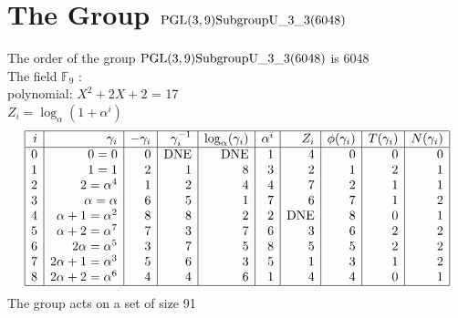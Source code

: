 
\section{The Group ${\rm PGL}(3,9){\rm Subgroup U\_3\_3}(6048)$}
\label{app:U33}
\noindent The order of the group ${\rm PGL}(3,9){\rm Subgroup U\_3\_3}(6048)$ is 6048\\
\noindent The field ${\mathbb F}_{9}$ :\\
\small
polynomial: $X^{2} + 2X + 2$ = 17\\
$Z_i = \log_\alpha (1 + \alpha^i)$\\
$$\begin{array}{|*{10}{r|}}
\hline
i & \gamma_i & -\gamma_i& \gamma_i^{-1}& \log_\alpha(\gamma_i)& \alpha^i& Z_i& \phi(\gamma_i) & T(\gamma_i) & N(\gamma_i) \\
\hline
  0 & 0 = 0 &0 & \mbox{DNE} & \mbox{DNE} &1 &4 &0 &0 &0\\
  1 &   1 = 1 &2 &1 &8 &3 &2 &1 &2 &1\\
  2 &   2 = \alpha^{4} &1 &2 &4 &4 &7 &2 &1 &1\\
  3 & \alpha = \alpha  &6 &5 &1 &7 &6 &7 &1 &2\\
  4 & \alpha +   1 = \alpha^{2} &8 &8 &2 &2 & \mbox{DNE} &8 &0 &1\\
  5 & \alpha +   2 = \alpha^{7} &7 &3 &7 &6 &3 &6 &2 &2\\
  6 &   2\alpha = \alpha^{5} &3 &7 &5 &8 &5 &5 &2 &2\\
  7 &   2\alpha +   1 = \alpha^{3} &5 &6 &3 &5 &1 &3 &1 &2\\
  8 &   2\alpha +   2 = \alpha^{6} &4 &4 &6 &1 &4 &4 &0 &1\\
\hline
\end{array}
$$
\noindent The group acts on a set of size 91\\
